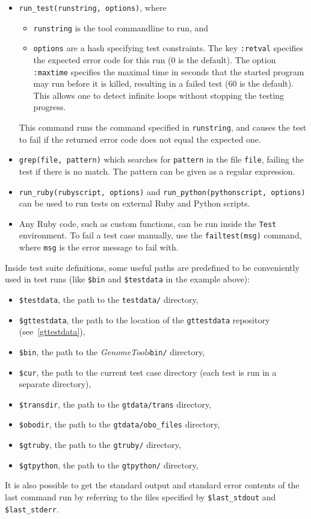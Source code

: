 \documentclass[11pt,final]{article}
\newcommand{\keyword}[1]{\lstinline{#1}}
\newcommand{\Gt}[0]{\emph{GenomeTools}\xspace}
\begin{document}
\begin{itemize}
\item
\keyword{run_test(runstring, options)}, where
\begin{itemize}
\item
\keyword{runstring} is the tool commandline to run, and
\item
\keyword{options} are a hash specifying test constraints.
The key \keyword{:retval} specifies the expected error code for this run (0 is
the default). The option \keyword{:maxtime} specifies the maximal time in
seconds that the started program may run before it is killed, resulting in a
failed test (60 is the default). This allows one to detect infinite loops
without stopping the testing progress.
\end{itemize}
This command runs the command specified in \keyword{runstring}, and causes the
test to fail if the returned error code does not equal the expected one.
\item
\keyword{grep(file, pattern)} which searches for \keyword{pattern} in the
file \keyword{file}, failing the test if there is no match. The pattern can be
given as a regular expression.
\item
\keyword{run_ruby(rubyscript, options)} and
\keyword{run_python(pythonscript, options)} can be used to run tests on
external Ruby and Python scripts.
\item
Any Ruby code, such as custom functions, can be run inside the \keyword{Test}
environment. To fail a test case manually, use the \keyword{failtest(msg)}
command, where \keyword{msg} is the error message to fail with.
\end{itemize}
Inside test suite definitions, some useful paths are predefined to be
conveniently used in test runs (like \keyword{$bin} and \keyword{$testdata} in
the example above):
\begin{itemize}
\item
\keyword{$testdata}, the path to the \keyword{testdata/} directory,
\item
\keyword{$gttestdata}, the path to the location of the \keyword{gttestdata}
repository (see~\ref{gttestdata}),
\item
\keyword{$bin}, the path to the \Gt \keyword{bin/} directory,
\item
\keyword{$cur}, the path to the current test case directory (each test is run in
a separate directory),
\item
\keyword{$transdir}, the path to the \keyword{gtdata/trans} directory,
\item
\keyword{$obodir}, the path to the \keyword{gtdata/obo_files} directory,
\item
\keyword{$gtruby}, the path to the \keyword{gtruby/} directory,
\item
\keyword{$gtpython}, the path to the \keyword{gtpython/} directory,
\end{itemize}
It is also possible to get the standard output and standard error contents of
the last command run by referring to the files specified by
\keyword{$last_stdout} and \keyword{$last_stderr}.
\end{document}
